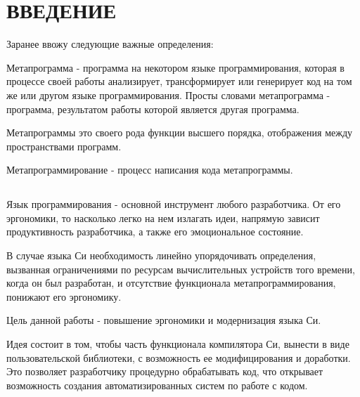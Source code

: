 \chapter*{ВВЕДЕНИЕ}                         %

Заранее ввожу следующие важные определения:

Метапрограмма - программа на некотором языке программирования, которая в процессе своей работы анализирует, трансформирует или генерирует код на том же или другом языке программирования.
Просты словами метапрограмма - программа, результатом работы которой является другая программа.

Метапрограммы это своего рода функции высшего порядка\cite{wiki-hof}, отображения между пространствами программ.

Метапрограммирование - процесс написания кода метапрограммы.
\section*{}
Язык программирования - основной инструмент любого разработчика. От его эргономики, то насколько легко на нем излагать идеи, напрямую зависит продуктивность разработчика, а также его эмоциональное состояние.

В случае языка Си необходимость линейно упорядочивать определения, вызванная ограничениями по ресурсам вычислительных устройств того времени, когда он был разработан, 
и отсутствие функционала метапрограммирования, понижают его эргономику.

Цель данной работы - повышение эргономики и модернизация языка Си.


Идея состоит в том, чтобы часть функционала компилятора Си, вынести в виде пользовательской библиотеки, с возможность ее модифицирования и доработки. 
Это позволяет разработчику процедурно обрабатывать код, что открывает возможность создания автоматизированных систем по работе с кодом.

